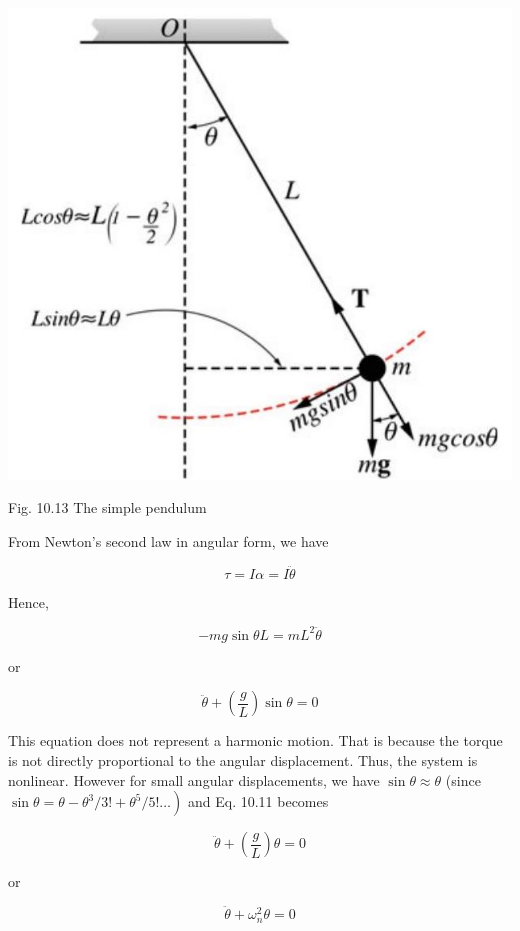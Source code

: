 \documentclass[10pt]{article}
\begin{document}
\begin{center}
\includegraphics[max width=\textwidth]{2024_09_13_db1f357d2aad0a03eb2eg-169(1)}
\end{center}

Fig. 10.13 The simple pendulum

From Newton's second law in angular form, we have

$$
\tau=I \alpha=I \ddot{\theta}
$$

Hence,

$$
-m g \sin \theta L=m L^{2} \ddot{\theta}
$$

or


\begin{equation*}
\ddot{\theta}+\left(\frac{g}{L}\right) \sin \theta=0 \tag{10.11}
\end{equation*}


This equation does not represent a harmonic motion. That is because the torque is not directly proportional to the angular displacement. Thus, the system is nonlinear. However for small angular displacements, we have $\sin \theta \approx \theta$ (since $\left.\sin \theta=\theta-\theta^{3} / 3!+\theta^{5} / 5!\ldots\right)$ and Eq. 10.11 becomes

$$
\ddot{\theta}+\left(\frac{g}{L}\right) \theta=0
$$

or


\begin{equation*}
\ddot{\theta}+\omega_{n}^{2} \theta=0 \tag{10.12}
\end{equation*}
\end{document}
